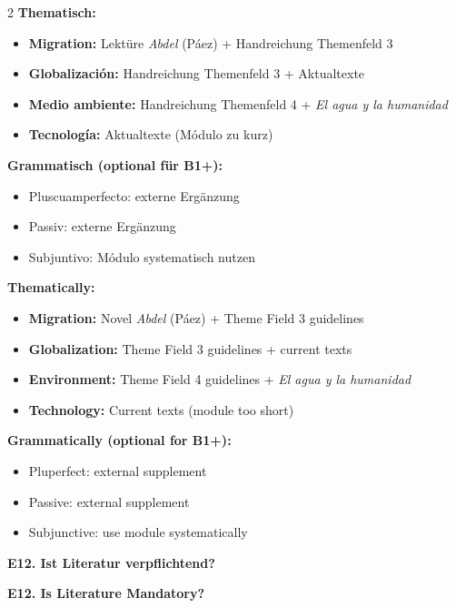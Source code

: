 \documentclass[10pt,a4paper]{article}
\newcommand{\secbil}[2]{%
\vspace{6pt}
\noindent\colorbox{spaet}{\parbox{0.48\textwidth}{\color{white}\bfseries\small #1}}%
\hfill%
\colorbox{english}{\parbox{0.48\textwidth}{\color{white}\bfseries\small #2}}
\vspace{3pt}
}
\begin{document}
\begin{paracol}{2}
\small
\textbf{Thematisch:}
\begin{itemize}[noitemsep,topsep=2pt]
\item \textbf{Migration:} Lektüre \textit{Abdel} (Páez) + Handreichung Themenfeld 3
\item \textbf{Globalización:} Handreichung Themenfeld 3 + Aktualtexte
\item \textbf{Medio ambiente:} Handreichung Themenfeld 4 + \textit{El agua y la humanidad}
\item \textbf{Tecnología:} Aktualtexte (Módulo zu kurz)
\end{itemize}

\textbf{Grammatisch (optional für B1+):}
\begin{itemize}[noitemsep,topsep=2pt]
\item Pluscuamperfecto: externe Ergänzung
\item Passiv: externe Ergänzung
\item Subjuntivo: Módulo systematisch nutzen
\end{itemize}

\switchcolumn

\small\color{english}
\textbf{Thematically:}
\begin{itemize}[noitemsep,topsep=2pt]
\item \textbf{Migration:} Novel \textit{Abdel} (Páez) + Theme Field 3 guidelines
\item \textbf{Globalization:} Theme Field 3 guidelines + current texts
\item \textbf{Environment:} Theme Field 4 guidelines + \textit{El agua y la humanidad}
\item \textbf{Technology:} Current texts (module too short)
\end{itemize}

\textbf{Grammatically (optional for B1+):}
\begin{itemize}[noitemsep,topsep=2pt]
\item Pluperfect: external supplement
\item Passive: external supplement
\item Subjunctive: use module systematically
\end{itemize}

\end{paracol}

\vspace{3mm}

\secbil{E12. Ist Literatur verpflichtend?}{E12. Is Literature Mandatory?}
\end{document}
